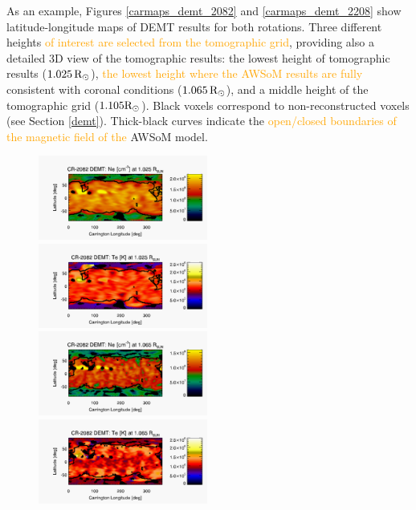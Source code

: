 \documentclass[namedreferences]{solarphysics}
\newcommand{\mrsun}{{\rm R_\odot}}
\def\albert#1{\textcolor{orange}{#1}}
\begin{document}
\begin{article}
{As an example,} Figures \ref{carmaps_demt_2082} and \ref{carmaps_demt_2208} show {latitude-longitude} maps of DEMT results for both {rotations. Three different heights \albert{of interest are selected from the tomographic grid}, providing also a detailed 3D view of the tomographic results: the lowest height of tomographic results ($1.025\,\mrsun$), \albert{the lowest height where the AWSoM results are fully} consistent with coronal conditions ($1.065\,\mrsun$), and a middle height of the tomographic grid ($1.105\mrsun$)}. Black voxels correspond to non-reconstructed voxels ({see} Section \ref{demt}). Thick-black {curves indicate} the \albert{open/closed boundaries of the magnetic field of the} AWSoM model. 

\begin{figure}[h!]
\begin{center}
\includegraphics[width=0.495\textwidth]{figs/map_Ne_CR2082_DEMT-EUVI_behind_H1-L3523_r3d_1025_Rsun.pdf}
\includegraphics[width=0.495\textwidth]{figs/map_Tm_CR2082_DEMT-EUVI_behind_H1-L3523_r3d_1025_Rsun.pdf}
\includegraphics[width=0.495\textwidth]{figs/map_Ne_CR2082_DEMT-EUVI_behind_H1-L3523_r3d_1065_Rsun.pdf}
\includegraphics[width=0.495\textwidth]{figs/map_Tm_CR2082_DEMT-EUVI_behind_H1-L3523_r3d_1065_Rsun.pdf}

\end{center}
\end{figure}
\end{article}
\end{document}

